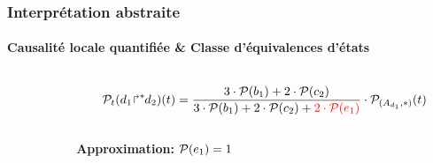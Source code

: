 \begin{frame}
\frametitle{Interprétation abstraite}
\framesubtitle{Causalité locale quantifiée \& Classe d'équivalences d'états}
\begin{columns}
\begin{column}{0.25\textwidth}
\begin{left}\scalebox{\scaleex}{
\begin{tikzpicture}
\exsanaidef
\end{tikzpicture}
}\end{left}
\end{column}
\begin{column}[c]{0.75\textwidth}

\begin{center}\scalebox{\scaleex}{
\exqlcgaidef
}\end{center}



$$\mathcal{P}_t ({d_1\!\Rsh^*\!\!d_2})(t) = \frac{3 \cdot \mathcal{P} (b_1) + 2 \cdot \mathcal{P} (c_2)}{3 \cdot \mathcal{P} (b_1) + 2 \cdot \mathcal{P} (c_2)+ {\color{red} 2 \cdot \mathcal{P} (e_1)}}\cdot \mathcal{P}_{{(A_{d_1}},{*)}} (t)$$ \\

\textbf{Approximation:} {\color{red} $\mathcal{P} (e_1) = 1$}


\end{column}
\end{columns}


\end{frame}
